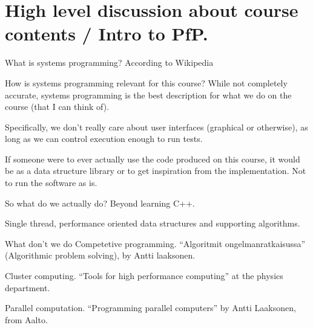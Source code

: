 \documentclass[11pt, aspectratio=169, table]{beamer}
\begin{document}
\section{High level discussion about course contents / Intro to PfP.}
\begin{frame}{What is systems programming?}
\setlength\parskip{\fill}
\pause
According to Wikipedia

\end{frame}

\begin{frame}{How is systems programming relevant for this course?}
\setlength\parskip{\fill}
\pause
While not completely accurate, systems programming is the best description for what we do on the course (that I can think of).

\pause
Specifically, we don't really care about user interfaces (graphical or otherwise), as long as we can control execution enough to 
run tests.

If someone were to ever actually use the code produced on this course, it would be as a data structure library or to get inspiration from
the implementation. Not to run the software as is.
\end{frame}

\begin{frame}{So what do we actually do?}
\setlength\parskip{\fill}
Beyond learning C++.\pause

Single thread, performance oriented data structures and supporting algorithms.
\end{frame}

\begin{frame}{What don't we do}
\setlength\parskip{\fill}\pause
Competetive programming. ``Algoritmit ongelmanratkaisussa'' (Algorithmic problem solving), by Antti laaksonen.

Cluster computing. ``Tools for high performance computing'' at the physics department.

Parallel computation. ``Programming parallel computers'' by Antti Laaksonen, from Aalto.
\end{frame}
\end{document}
